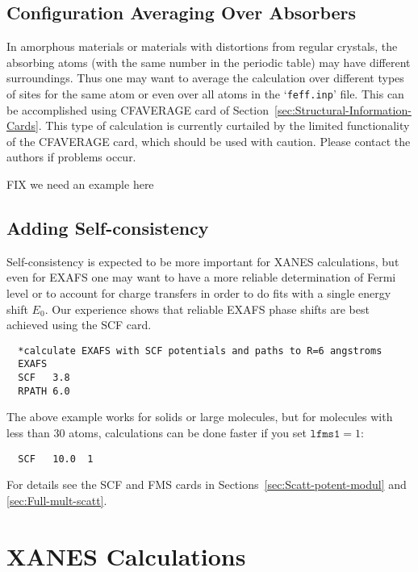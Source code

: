 \documentclass[11pt,oneside]{report} %
\renewcommand{\htmlref}[2]{\hyperlink{#2}{#1}}
\newcommand{\file}[1]{`\texttt{#1}'}
\renewcommand{\htmlref}[2]{{#1}} %
\begin{document}
\subsection{Configuration Averaging Over Absorbers}
\label{sec:Aver-over-absorb}
In amorphous materials or materials with distortions from regular
crystals, the absorbing atoms (with the same number in the periodic table)
may have different surroundings. Thus one may want to average the
calculation over different types of sites for the same atom or even
over all atoms in the \file{feff.inp} file. This can be accomplished using
\htmlref{CFAVERAGE}{card:cfa} card of Section~\ref{sec:Structural-Information-Cards}.
This type of calculation is currently curtailed by 
the limited functionality of the CFAVERAGE card, which should be used 
with caution.  Please contact the authors if problems occur.

FIX we need an example here


\subsection{Adding Self-consistency}
\label{sec:Adding-self-cons}
Self-consistency is expected to be more important for XANES
calculations, but even for EXAFS one may want to have a more reliable
determination of Fermi level or to account for charge transfers in
order to do fits with a single energy shift $E_0$. Our experience shows
that reliable EXAFS phase shifts are best achieved using the 
\htmlref{SCF}{card:scf} card.

\begin{verbatim}
  *calculate EXAFS with SCF potentials and paths to R=6 angstroms
  EXAFS
  SCF   3.8
  RPATH 6.0
\end{verbatim}

The above example works for solids or large molecules, but for molecules with 
less than 30 atoms, calculations can be done faster if you set $\mathtt{lfms1}=1$:
\begin{verbatim}
  SCF   10.0  1
\end{verbatim}

For details see the \htmlref{SCF}{card:scf} and \htmlref{FMS}{card:fms} cards in
Sections~\ref{sec:Scatt-potent-modul} and \ref{sec:Full-mult-scatt}.


\section{XANES Calculations}
\label{sec:XANES-calculations}
\end{document}
